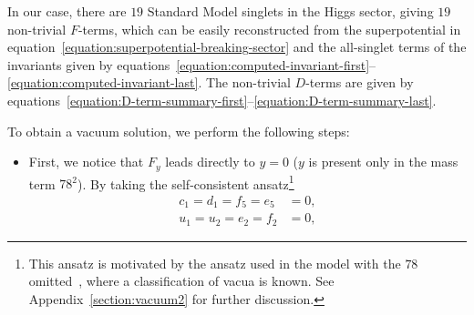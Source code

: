\documentclass[a4paper,12pt]{article}
\begin{document}
In our case, there are $19$ Standard Model singlets in the Higgs sector, giving $19$ non-trivial $F$-terms, which can be easily reconstructed from the superpotential in equation~\eqref{equation:superpotential-breaking-sector} and the all-singlet terms of the invariants given by equations~\eqref{equation:computed-invariant-first}--\eqref{equation:computed-invariant-last}. The non-trivial $D$-terms are given by equations~\eqref{equation:D-term-summary-first}--\eqref{equation:D-term-summary-last}.

To obtain a vacuum solution, we perform the following steps:
\begin{itemize}
\item
First, we notice that $F_y$ leads directly to $y=0$ ($y$ is present only in the mass term $78^2$). By taking the self-consistent ansatz\footnote{This ansatz is motivated by the ansatz used in the model with the $78$ omitted~\cite{Bajc:2013qra}, where a classification of vacua is known. See Appendix~\ref{section:vacuum2} for further discussion.}
    \begin{align}
    c_1=d_1=f_5=e_5&=0,\label{equation:ansatz-first}\\
    u_1=u_2=e_2=f_2&=0,\label{equation:ansatz-last}
    \end{align}


\end{itemize}
\end{document}
